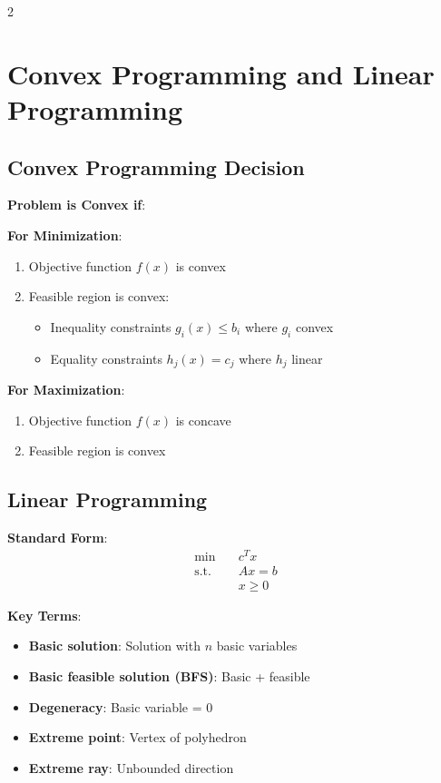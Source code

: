 \documentclass[10pt,a4paper,landscape]{article}
\begin{document}
\begin{multicols}{2}

\section*{Convex Programming and Linear Programming}

\subsection*{Convex Programming Decision}

\textbf{Problem is Convex if}:

\textbf{For Minimization}:
\begin{enumerate}
\item Objective function $f(x)$ is convex
\item Feasible region is convex:
   \begin{itemize}
   \item Inequality constraints $g_i(x) \leq b_i$ where $g_i$ convex
   \item Equality constraints $h_j(x) = c_j$ where $h_j$ linear
   \end{itemize}
\end{enumerate}

\textbf{For Maximization}:
\begin{enumerate}
\item Objective function $f(x)$ is concave
\item Feasible region is convex
\end{enumerate}

\subsection*{Linear Programming}
\textbf{Standard Form}:
\begin{align}
\min \quad & c^T x \\
\text{s.t.} \quad & Ax = b \\
& x \geq 0
\end{align}

\textbf{Key Terms}:
\begin{itemize}
\item \textbf{Basic solution}: Solution with $n$ basic variables
\item \textbf{Basic feasible solution (BFS)}: Basic + feasible
\item \textbf{Degeneracy}: Basic variable = 0
\item \textbf{Extreme point}: Vertex of polyhedron
\item \textbf{Extreme ray}: Unbounded direction
\end{itemize}


\end{multicols}
\end{document}
